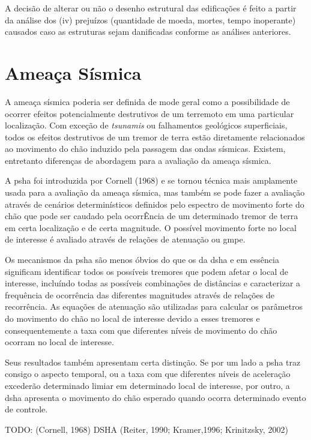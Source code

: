 A decisão de alterar ou não o desenho estrutural das edificações é feito a partir da análise dos (iv) prejuízos
(quantidade de moeda, mortes, tempo inoperante) causados caso as estruturas sejam danificadas conforme as análises anteriores.


\section{Ameaça Sísmica}
\label{sec:ameaca_sismica}

A ameaça sísmica poderia ser definida de mode geral como a possibilidade de ocorrer efeitos potencialmente destrutivos
de um terremoto em uma particular localização. Com exceção de \textit{tsunamis} ou falhamentos geológicos superficiais,
todos os efeitos destrutivos de um tremor de terra estão diretamente relacionados ao movimento do chão induzido pela
passagem das ondas sísmicas. Existem, entretanto diferenças de abordagem para a avaliação da ameaça sísmica.

A \gls{psha} foi introduzida por Cornell (1968) e se tornou técnica mais amplamente usada para a avaliação da
ameaça sísmica, mas também se pode fazer a avaliação através de cenários determinísticos definidos pelo espectro de
movimento forte do chão que pode ser caudado pela ocorrÊncia de um determinado tremor de terra em certa localização e
de certa magnitude. O possível movimento forte no local de interesse é avaliado através de relações de atenuação ou
\gls{gmpe}.

Os mecanismos da \gls{psha} são menos óbvios do que os da \gls{dsha} e em essência significam identificar todos os
possíveis tremores que podem afetar o local de interesse, incluíndo todas as possíveis combinações de distâncias e
caracterizar a frequência de ocorrência das diferentes magnitudes através de relações de recorrência. As equações de
atenuação são utilizadas para calcular os parâmetros do movimento do chão no local de interesse devido a esses tremores
e consequentemente a taxa com que diferentes níveis de movimento do chão ocorram no local de interesse. 

Seus resultados também apresentam certa distinção. Se por um lado a \gls{psha} traz consigo o aspecto temporal, ou a
taxa com que diferentes níveis de aceleração excederão determinado limiar em determinado local de interesse,
por outro, a \gls{dsha} apresenta o movimento do chão esperado quando ocorra determinado evento de controle.

TODO:
(Cornell, 1968) 
DSHA  (Reiter, 1990; Kramer,1996; Krinitzsky, 2002)

